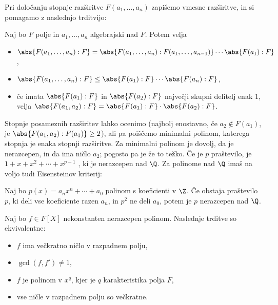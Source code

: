 

Pri določanju stopnje razširitve $F(a_1, \ldots, a_n)$ zapišemo vmesne
razširitve, in si pomagamo z naslednjo trditvijo:

\begin{trditev}
  Naj bo $F$ polje in $a_1, \ldots, a_n$ algebrajski nad $F$.
  Potem velja
  \begin{itemize}
  \item $\abs{F(a_1, \ldots, a_n) : F} = \abs{F(a_1, \ldots, a_n) : F(a_1,
	  \ldots, a_{n-1})} \cdots  \abs{F(a_1):F}$,
  \item $\abs{F(a_1, \ldots, a_n):F} \le \abs{F(a_1):F} \cdots \abs{F(a_n): F}$,
  \item če imata $\abs{F(a_1) : F}$ in $\abs{F(a_2) : F}$ največji skupni
	delitelj enak $1$, velja $\abs{F(a_1, a_2) : F} = \abs{F(a_1):F} \cdot
	\abs{F(a_2):F}$.
  \end{itemize}
\end{trditev}

Stopnje posameznih razširitev lahko ocenimo (najbolj enostavno, če $a_2 \notin
F(a_1)$, je $\abs{F(a_1, a_2):F(a_1)} \ge 2$), ali pa poiščemo minimalni
polinom, katerega stopnja je enaka stopnji razširitve.
Za minimalni polinom je dovolj, da je nerazcepen, in da ima ničlo $a_2$; pogosto
pa je že to težko.
Če je $p$ praštevilo, je $1 + x + x^2 + \cdots + x^{p-1}$ , ki je nerazcepen nad $\Q$.
Za polinome nad $\Q$ imaš na voljo tudi Eisensteinov kriterij:

\begin{trditev}
  Naj bo $p(x) = a_n x^n + \cdots + a_0$ polinom s koeficienti v $\Z$.
  Če obstaja praštevilo $p$, ki deli vse koeficiente razen $a_n$, in $p^2$ ne
  deli $a_0$, potem je $p$ nerazcepen nad $\Q$.
\end{trditev}

\begin{izrek}
  Naj bo $f \in F[X]$ nekonstanten nerazcepen polinom.
  Naslednje trditve so ekvivalentne:
  \begin{itemize}
  \item $f$ ima večkratno ničlo v razpadnem polju,
  \item $\operatorname{gcd}(f, f') \ne 1$,
  \item $f$ je polinom v $x^q$, kjer je $q$ karakteristika polja $F$,
  \item vse ničle v razpadnem polju so večkratne.
  \end{itemize}
\end{izrek}

